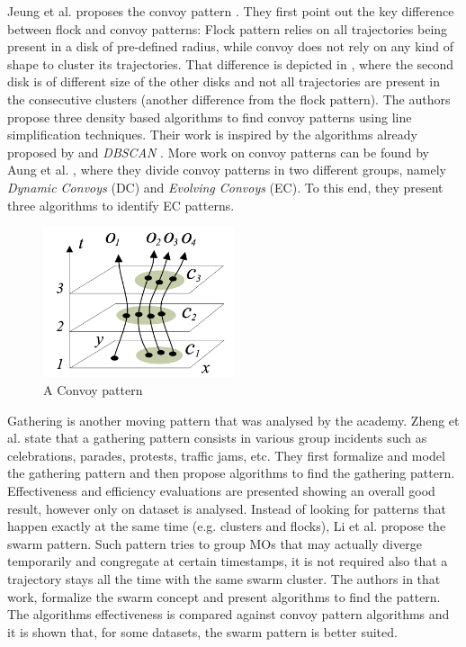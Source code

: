 Jeung et al. proposes the convoy pattern \citep{convoy2}\citep{convoy}. They first point out the key difference between
flock and convoy patterns: Flock pattern relies on all trajectories being present in a disk of pre-defined radius, while
convoy does not rely on any kind of shape to cluster its trajectories. That difference is depicted in
, where the second disk is of different size of the other disks and not all trajectories are
present in the consecutive clusters (another difference from the flock pattern). The authors propose three density based
algorithms to find convoy patterns using line simplification techniques. Their work is inspired by the algorithms
already proposed by \citep{movingclusters} and \textit{DBSCAN} \citep{dbscan}. More work on convoy patterns can be found
by Aung et al. \citep{convoy3}, where they divide convoy patterns in two different groups, namely \textit{Dynamic
Convoys} (DC) and \textit{Evolving Convoys} (EC). To this end, they present three algorithms to identify EC patterns.

\begin{figure}
    \centering
    \includegraphics[width=0.5\textwidth]{images/convoy.png}
    \caption{A Convoy pattern \citep{convoy2}}
    \label{fig:convoy_pattern}
\end{figure}

Gathering is another moving pattern that was analysed by the academy. Zheng et al. \citep{gathering} state that a
gathering pattern consists in various group incidents such as celebrations, parades, protests, traffic jams, etc. They
first formalize and model the gathering pattern and then propose algorithms to find the gathering pattern. Effectiveness
and efficiency evaluations are presented showing an overall good result, however only on dataset is analysed. Instead of
looking for patterns that happen exactly at the same time (e.g. clusters and flocks), Li et al. \citep{swarm} propose
the swarm pattern. Such pattern tries to group MOs that may actually diverge temporarily and congregate at certain
timestamps, it is not required also that a trajectory stays all the time with the same swarm cluster. The authors in
that work, formalize the swarm concept and present algorithms to find the pattern. The algorithms effectiveness is
compared against convoy pattern algorithms and it is shown that, for some datasets, the swarm pattern is better suited.


